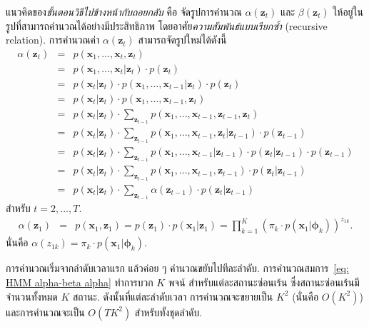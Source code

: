 แนวคิดของ\textit{ขั้นตอนวิธีไปข้างหน้ากับถอยกลับ}
คือ จัดรูปการคำนวณ $\alpha(\bm{z}_t)$ และ $\beta(\bm{z}_t)$
ให้อยู่ในรูปที่สามารถคำนวณได้อย่างมีประสิทธิภาพ โดยอาศัย\textit{ความสัมพันธ์แบบเรียกซ้ำ} (recursive relation).
การคำนวณค่า $\alpha(\bm{z}_t)$ สามารถจัดรูปใหม่ได้ดังนี้
\begin{eqnarray}
\alpha(\bm{z}_t)
&=&
p(\bm{x}_1, \ldots, \bm{x}_t, \bm{z}_t)
\nonumber \\
&=&
p(\bm{x}_1, \ldots, \bm{x}_t| \bm{z}_t) \cdot p(\bm{z}_t)
\nonumber \\
&=&
p(\bm{x}_t|\bm{z}_t) \cdot p(\bm{x}_1, \ldots, \bm{x}_{t-1}| \bm{z}_t) \cdot p(\bm{z}_t)
\nonumber \\
&=&
p(\bm{x}_t|\bm{z}_t) \cdot p(\bm{x}_1, \ldots, \bm{x}_{t-1}, \bm{z}_t)
\nonumber \\
&=&
p(\bm{x}_t|\bm{z}_t) \cdot \sum_{\bm{z}_{t-1}} p(\bm{x}_1, \ldots, \bm{x}_{t-1}, \bm{z}_{t-1}, \bm{z}_t)
\nonumber \\
&=&
p(\bm{x}_t|\bm{z}_t) \cdot \sum_{\bm{z}_{t-1}} p(\bm{x}_1, \ldots, \bm{x}_{t-1}, \bm{z}_t| \bm{z}_{t-1}) \cdot p(\bm{z}_{t-1})
\nonumber \\
&=&
p(\bm{x}_t|\bm{z}_t) \cdot \sum_{\bm{z}_{t-1}} p(\bm{x}_1, \ldots, \bm{x}_{t-1}| \bm{z}_{t-1}) 
\cdot p(\bm{z}_t|\bm{z}_{t-1}) \cdot p(\bm{z}_{t-1})
\nonumber \\
&=&
p(\bm{x}_t|\bm{z}_t) \cdot \sum_{\bm{z}_{t-1}} p(\bm{x}_1, \ldots, \bm{x}_{t-1}, \bm{z}_{t-1}) 
\cdot p(\bm{z}_t|\bm{z}_{t-1}) 
\nonumber \\
&=&
p(\bm{x}_t|\bm{z}_t) \cdot \sum_{\bm{z}_{t-1}} \alpha(\bm{z}_{t-1}) 
\cdot p(\bm{z}_t|\bm{z}_{t-1})
\label{eq: HMM alpha-beta alpha}
\end{eqnarray}
สำหรับ $t = 2, \ldots, T$.
\begin{eqnarray}
\alpha(\bm{z}_1)
&=& p(\bm{x}_1, \bm{z}_1)
= p(\bm{z}_1) \cdot p(\bm{x}_1|\bm{z}_1) = \prod_{k=1}^K \left( \pi_k \cdot p(\bm{x}_1|\bm{\phi}_k) \right)^{z_{1k}}
\label{eq: HMM alpha-beta alpha t1}.
\end{eqnarray}
นั่นคือ $\alpha( z_{1k} ) = \pi_k \cdot p(\bm{x}_1|\bm{\phi}_k)$.

การคำนวณเริ่มจากลำดับเวลาแรก แล้วค่อย ๆ คำนวณขยับไปทีละลำดับ.
การคำนวณสมการ~\ref{eq: HMM alpha-beta alpha}
ทำการบวก $K$ พจน์ สำหรับแต่ละสถานะซ่อนเร้น ซึ่งสถานะซ่อนเร้นมีจำนวนทั้งหมด $K$ สถานะ.
ดังนั้นที่แต่ละลำดับเวลา การคำนวณจะขยายเป็น $K^2$ (นั่นคือ $O(K^2)$)
และการคำนวณจะเป็น $O(T K^2)$ สำหรับทั้งชุดลำดับ.

